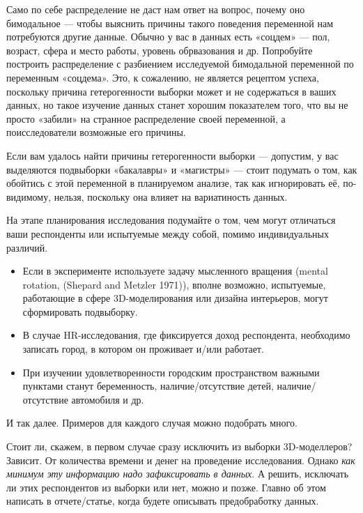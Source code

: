 \documentclass[
  letterpaper,
  DIV=11,
  numbers=noendperiod]{scrreprt}
\providecommand{\tightlist}{%
  \setlength{\itemsep}{0pt}\setlength{\parskip}{0pt}}\usepackage{longtable,booktabs,array}
\theoremstyle{definition}
\theoremstyle{remark}
\begin{document}
Само по себе распределение не даст нам ответ на вопрос, почему оно
бимодальное --- чтобы выяснить причины такого поведения переменной нам
потребуются другие данные. Обычно у вас в данных есть «соцдем» --- пол,
возраст, сфера и место работы, уровень обрвазования и др. Попробуйте
построить распределение с разбиением исследуемой бимодальной переменной
по переменным «соцдема». Это, к сожалению, не является рецептом успеха,
поскольку причина гетерогенности выборки может и не содержаться в ваших
данных, но такое изучение данных станет хорошим показателем того, что вы
не просто «забили» на странное распределение своей переменной, а
поисследователи возможные его причины.

Если вам удалось найти причины гетерогенности выборки --- допустим, у
вас выделяются подвыборки «бакалавры» и «магистры» --- стоит подумать о
том, как обойтись с этой переменной в планируемом анализе, так как
игнорировать её, по-видимому, нельзя, поскольку она влияет на
вариатиность данных.

\begin{tcolorbox}[enhanced jigsaw, leftrule=.75mm, bottomtitle=1mm, left=2mm, opacitybacktitle=0.6, breakable, coltitle=black, titlerule=0mm, colbacktitle=quarto-callout-tip-color!10!white, toprule=.15mm, opacityback=0, bottomrule=.15mm, colframe=quarto-callout-tip-color-frame, title=\textcolor{quarto-callout-tip-color}{\faLightbulb}\hspace{0.5em}{Соцдем лишним не бывает}, toptitle=1mm, colback=white, rightrule=.15mm, arc=.35mm]

На этапе планирования исследования подумайте о том, чем могут отличаться
ваши респонденты или испытуемые между собой, помимо индивидуальных
различий.

\begin{itemize}
\tightlist
\item
  Если в эксперименте используете задачу мысленного вращения (mental
  rotation, (Shepard and Metzler 1971)), вполне возможно, испытуемые,
  работающие в сфере 3D-моделирования или дизайна интерьеров, могут
  сформировать подвыборку.
\item
  В случае HR-исследования, где фиксируется доход респондента,
  необходимо записать город, в котором он проживает и/или работает.
\item
  При изучении удовлетворенности городским пространством важными
  пунктами станут беременность, наличие/отсутствие детей,
  наличие/отсутствие автомобиля и др.
\end{itemize}

И так далее. Примеров для каждого случая можно подобрать много.

Стоит ли, скажем, в первом случае сразу исключить из выборки
3D-моделлеров? Зависит. От количества времени и денег на проведение
исследования. Однако \emph{как минимум эту информацию надо зафиксировать
в данных}. А решить, исключать ли этих респондентов из выборки или нет,
можно и позже. Главно об этом написать в отчете/статье, когда будете
описывать предобработку данных.

\end{tcolorbox}
\end{document}
